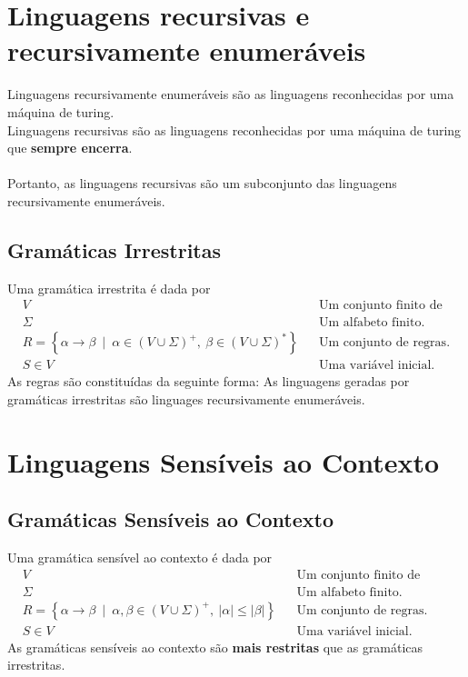 \documentclass[11pt]{article}
\begin{document}
\section{Linguagens recursivas e recursivamente enumeráveis}
\label{sec:orgf2a8534}
Linguagens recursivamente enumeráveis são as linguagens reconhecidas por uma máquina de
turing. \\
Linguagens recursivas são as linguagens reconhecidas por uma máquina de turing que
\textbf{sempre encerra}. \\ \\
Portanto, as linguagens recursivas são um subconjunto das linguagens recursivamente
enumeráveis.
\subsection{Gramáticas Irrestritas}
\label{sec:org9ea8d86}
Uma gramática irrestrita é dada por
\begin{align*}
  & V && \text{Um conjunto finito de variáveis.} \\
  & \Sigma && \text{Um alfabeto finito.} \\
  & R = \left\{ \alpha \to \beta \enspace\big|\enspace \alpha \in \left(V \cup \Sigma\right)^+,\> \beta \in \left(V \cup \Sigma\right)^* \right\} && \text{Um conjunto de regras.} \\
  & S \in V && \text{Uma variável inicial.}
\end{align*}
As regras são constituídas da seguinte forma:
As linguagens geradas por gramáticas irrestritas são linguages recursivamente
enumeráveis.
\section{Linguagens Sensíveis ao Contexto}
\label{sec:orga304023}
\subsection{Gramáticas Sensíveis ao Contexto}
\label{sec:org392c4b9}
Uma gramática sensível ao contexto é dada por
\begin{align*}
  & V && \text{Um conjunto finito de variáveis.} \\
  & \Sigma && \text{Um alfabeto finito.} \\
  & R = \left\{ \alpha \to \beta \enspace\big|\enspace \alpha, \beta \in \left(V \cup \Sigma\right)^+,\> |\alpha| \leq |\beta| \right\} && \text{Um conjunto de regras.} \\
  & S \in V && \text{Uma variável inicial.}
\end{align*}
As gramáticas sensíveis ao contexto são \textbf{mais restritas} que as gramáticas irrestritas.
\end{document}

